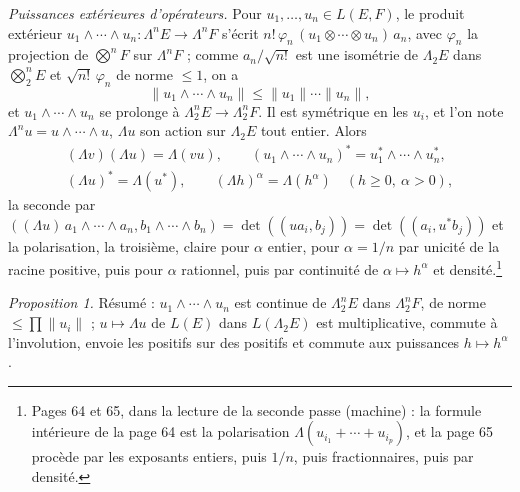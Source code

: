 \documentclass[11pt,a4paper]{article}
\begin{document}
\emph{Puissances extérieures d'opérateurs.} Pour $u_1, \ldots, u_n \in L(E,F)$,
le produit extérieur $u_1 \wedge \cdots \wedge u_n : \Lambda^n E \to \Lambda^n
F$ s'écrit $n!\,\varphi_n\,(u_1 \otimes \cdots \otimes u_n)\,a_n$, avec
$\varphi_n$ la projection de $\bigotimes^n F$ sur $\Lambda^n F$ ; comme
$a_n/\sqrt{n!}$ est une isométrie de $\Lambda_2 E$ dans $\bigotimes^n_2 E$ et
$\sqrt{n!}\,\varphi_n$ de norme $\leq 1$, on a
\[
  \|u_1 \wedge \cdots \wedge u_n\| \leq \|u_1\| \cdots \|u_n\|,
\]
et $u_1 \wedge \cdots \wedge u_n$ se prolonge à $\Lambda^n_2 E \to \Lambda^n_2
F$. Il est symétrique en les $u_i$, et l'on note $\Lambda^n u = u \wedge
\cdots \wedge u$, $\Lambda u$ son action sur $\Lambda_2 E$ tout entier.
Alors
\begin{gather*}
  (\Lambda v)(\Lambda u) = \Lambda(vu), \qquad
  (u_1 \wedge \cdots \wedge u_n)^{*} = u_1^{*} \wedge \cdots \wedge u_n^{*}, \\
  (\Lambda u)^{*} = \Lambda(u^{*}), \qquad
  (\Lambda h)^\alpha = \Lambda(h^\alpha)\quad (h \geq 0,\ \alpha > 0),
\end{gather*}
la seconde par $((\Lambda u)\,a_1 \wedge \cdots \wedge a_n, b_1 \wedge \cdots
\wedge b_n) = \det((ua_i, b_j)) = \det((a_i, u^{*}b_j))$ et la polarisation,
la troisième, claire pour $\alpha$ entier, pour $\alpha = 1/n$ par unicité
de la racine positive, puis pour $\alpha$ rationnel, puis par continuité de
$\alpha \mapsto h^\alpha$ et densité.\footnote{Pages 64 et 65, dans la
lecture de la seconde passe (machine) : la formule intérieure de la page 64
est la polarisation $\Lambda(u_{i_1} + \cdots + u_{i_p})$, et la page 65
procède par les exposants entiers, puis $1/n$, puis fractionnaires, puis par
densité.}

\emph{Proposition 1.} Résumé : $u_1 \wedge \cdots \wedge u_n$ est continue de
$\Lambda^n_2 E$ dans $\Lambda^n_2 F$, de norme $\leq \prod \|u_i\|$ ; $u
\mapsto \Lambda u$ de $L(E)$ dans $L(\Lambda_2 E)$ est multiplicative,
commute à l'involution, envoie les positifs sur des positifs et commute aux
puissances $h \mapsto h^\alpha$.
\end{document}
